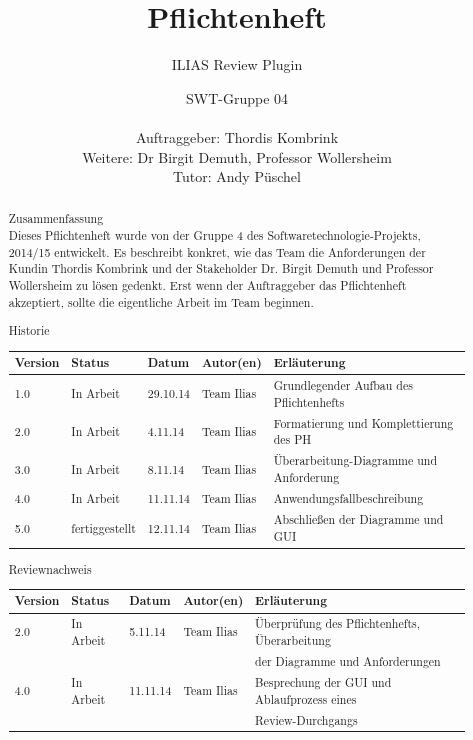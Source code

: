 \documentclass[a4paper]{scrreprt}
\begin{document}
 
\title{Pflichtenheft}
\subtitle{ILIAS Review Plugin}
\publishers{Version: 5.0, Status: Fertiggestellt}
\author{SWT-Gruppe 04\\ \\Auftraggeber: Thordis Kombrink\\Weitere: Dr Birgit Demuth, Professor Wollersheim\\Tutor: Andy Püschel}
\maketitle

\begin{abstract}
\Huge{Zusammenfassung}\\\normalsize
Dieses Pflichtenheft wurde von der Gruppe 4 des Softwaretechnologie-Projekts, 2014/15 entwickelt. Es beschreibt konkret, wie das Team die Anforderungen der Kundin Thordis Kombrink und der Stakeholder Dr. Birgit Demuth und Professor Wollersheim zu lösen gedenkt. Erst wenn der Auftraggeber das Pflichtenheft akzeptiert, sollte die eigentliche Arbeit im Team beginnen.
\vspace{1cm}
 
\huge{Historie}\\\normalsize
\begin{tabular}[c]{|l|l|l|l|l|}\hline
Version & Status & Datum & Autor(en) & Erläuterung\\\hline
1.0 & In Arbeit & 29.10.14 & Team Ilias & Grundlegender Aufbau des Pflichtenhefts\\\hline
2.0 & In Arbeit & 4.11.14 & Team Ilias & Formatierung und Komplettierung des PH \\\hline
3.0 & In Arbeit & 8.11.14 & Team Ilias & Überarbeitung-Diagramme und Anforderung \\\hline
4.0 & In Arbeit & 11.11.14 & Team Ilias & Anwendungsfallbeschreibung\\\hline
5.0 & fertiggestellt & 12.11.14 & Team Ilias & Abschließen der Diagramme und GUI\\\hline
\end{tabular}
\vspace{0.5cm}
 
\huge{Reviewnachweis}\\\normalsize
\begin{tabular}[c]{|l|l|l|l|l|}\hline
Version & Status & Datum & Autor(en) & Erläuterung\\\hline
2.0 & In Arbeit & 5.11.14 & Team Ilias & Überprüfung des Pflichtenhefts, Überarbeitung\\
&&&& der Diagramme und Anforderungen\\\hline
4.0 & In Arbeit & 11.11.14 & Team Ilias & Besprechung der GUI und Ablaufprozess eines\\
&&&& Review-Durchgangs\\\hline
\end{tabular}
\end{abstract}
\end{document}
